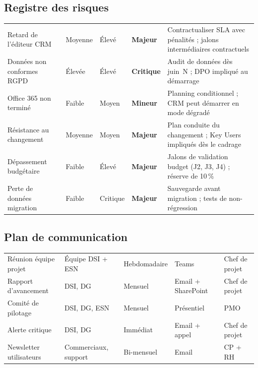 \documentclass[11pt,a4paper,oneside]{report}
\begin{document}
\subsection{Registre des risques}

\begin{center}
\renewcommand{\arraystretch}{1.5}
\scriptsize
\begin{tabularx}{\textwidth}{L{3.5cm} C{1.5cm} C{1.5cm} C{1.8cm} L{5.5cm}}
\toprule
{}
 &  &  &  &  \\
\midrule
Retard de l'éditeur CRM & Moyenne & Élevé & \textbf{Majeur} & Contractualiser SLA avec pénalités ; jalons intermédiaires contractuels \\
Données non conformes RGPD & Élevée & Élevé & \textbf{Critique} & Audit de données dès juin~N ; DPO impliqué au démarrage \\
Office 365 non terminé & Faible & Moyen & \textbf{Mineur} & Planning conditionnel ; CRM peut démarrer en mode dégradé \\
Résistance au changement & Moyenne & Moyen & \textbf{Majeur} & Plan conduite du changement ; Key Users impliqués dès le cadrage \\
Dépassement budgétaire & Faible & Élevé & \textbf{Majeur} & Jalons de validation budget (J2, J3, J4) ; réserve de 10\,\% \\
Perte de données migration & Faible & Critique & \textbf{Majeur} & Sauvegarde avant migration ; tests de non-régression \\
\bottomrule
\end{tabularx}
\end{center}
\normalsize

\subsection{Plan de communication}

\begin{center}
\renewcommand{\arraystretch}{1.5}
\begin{tabularx}{\textwidth}{L{4cm} L{3.5cm} C{2.2cm} C{2cm} L{2.8cm}}
\toprule
{}
 &  &  &  &  \\
\midrule
Réunion équipe projet & Équipe DSI + ESN & Hebdomadaire & Teams & Chef de projet \\
Rapport d'avancement & DSI, DG & Mensuel & Email + SharePoint & Chef de projet \\
Comité de pilotage & DSI, DG, ESN & Mensuel & Présentiel & PMO \\
Alerte critique & DSI, DG & Immédiat & Email + appel & Chef de projet \\
Newsletter utilisateurs & Commerciaux, support & Bi-mensuel & Email & CP + RH \\
\bottomrule
\end{tabularx}
\end{center}
\end{document}
